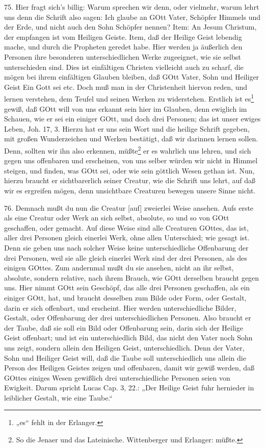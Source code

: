 75. Hier fragt sich's billig: Warum sprechen wir denn, oder vielmehr, warum lehrt uns denn die Schrift also sagen: Ich glaube an GOtt Vater, Schöpfer Himmels und der Erde, und nicht auch den Sohn Schöpfer nennen? Item: An Jesum Christum, der empfangen ist vom Heiligen Geiste. Item, daß der Heilige Geist lebendig mache, und durch die Propheten geredet habe. Hier werden ja äußerlich den Personen ihre besonderen unterschiedlichen Werke zugeeignet, wie sie selbst unterschieden sind. Dies ist einfältigen Christen vielleicht auch zu scharf, die mögen bei ihrem einfältigen Glauben bleiben, daß GOtt Vater, Sohn und Heiliger Geist Ein Gott sei etc. Doch muß man in der Christenheit hiervon reden, und lernen verstehen, dem Teufel und seinen Werken zu widerstehen. Erstlich ist es\footnote{„es“ fehlt in der Erlanger.} gewiß, daß GOtt will von uns erkannt sein hier im Glauben, denn
ewiglich im Schauen, wie er sei ein einiger GOtt, und doch drei Personen; das ist unser ewiges Leben, Joh. 17, 3. Hierzu hat er uns sein Wort und die heilige Schrift gegeben, mit großen Wunderzeichen und Werken bestätigt, daß wir darinnen lernen sollen. Denn, sollten wir ihn also erkennen, müßte\footnote{So die Jenaer und das Lateinische. Wittenberger und Erlanger: müßte.} er es wahrlich uns lehren, und sich gegen uns offenbaren und erscheinen, von uns selber würden wir nicht in Himmel steigen, und finden, was GOtt sei, oder wie sein göttlich Wesen gethan ist. Nun, hierzu braucht er sichtbarerlich seiner Creatur, wie die Schrift uns lehrt, auf daß wir es ergreifen mögen, denn unsichtbare Creaturen bewegen unsere Sinne nicht.

76. Demnach mußt du nun die Creatur [auf] zweierlei Weise ansehen. Aufs erste als eine Creatur oder Werk an sich selbst, absolute, so und so von GOtt geschaffen, oder gemacht. Auf diese Weise sind alle Creaturen GOttes, das ist, aller drei Personen gleich einerlei Werk, ohne allen Unterschied; wie gesagt ist. Denn sie geben uns nach solcher Weise keine unterschiedliche Offenbarung der drei Personen, weil sie alle gleich einerlei Werk sind der drei Personen, als des einigen GOttes. Zum andernmal mußt du sie ansehen, nicht an ihr selbst, absolute, sondern relative, nach ihrem Brauch, wie GOtt derselben braucht gegen uns. Hier nimmt GOtt sein Geschöpf, das alle drei Personen geschaffen, als ein einiger GOtt, hat, und braucht desselben zum Bilde oder Form, oder Gestalt, darin er sich offenbart, und erscheint. Hier werden unterschiedliche Bilder, Gestalt, oder Offenbarung der drei unterschiedlichen Personen. Also braucht er der Taube, daß sie soll ein Bild oder Offenbarung sein, darin sich der Heilige Geist offenbart; und ist ein unterschiedlich Bild, das nicht den Vater noch Sohn uns zeigt, sondern allein den Heiligen Geist, unterschiedlich. Denn der Vater, Sohn und Heiliger Geist will, daß die Taube soll unterschiedlich uns allein die Person des Heiligen Geistes zeigen und offenbaren, damit wir gewiß werden, daß GOttes einiges Wesen gewißlich drei unterschiedliche Personen seien von Ewigkeit. Darum spricht Lucas Cap. 3, 22.: „Der Heilige Geist fuhr hernieder in leiblicher Gestalt, wie eine Taube.“

